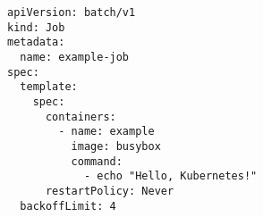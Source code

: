 \begin{verbatim}
apiVersion: batch/v1
kind: Job
metadata:
  name: example-job
spec:
  template:
    spec:
      containers:
        - name: example
          image: busybox
          command:
            - echo "Hello, Kubernetes!"
      restartPolicy: Never
  backoffLimit: 4

\end{verbatim}